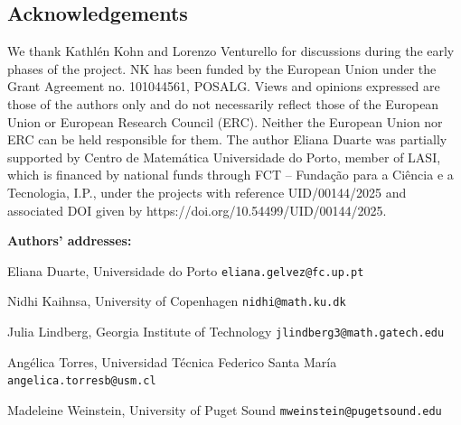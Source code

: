 \documentclass{article}
\numberwithin{theorem}{section}
\theoremstyle{definition}
\theoremstyle{example_contd}
\begin{document}
\subsection*{Acknowledgements}
{\small We thank Kathlén Kohn and Lorenzo Venturello for discussions during the early phases of the project. NK has been funded by the European Union under the Grant Agreement no. 101044561, POSALG. Views and opinions expressed are those of the authors only and do not necessarily reflect those of the European Union or European Research Council (ERC). Neither the European Union nor ERC can be held responsible for them. The author Eliana Duarte was partially supported by Centro de Matemática Universidade do Porto, member of LASI, which is financed by national funds through FCT – Fundação para a Ciência e a Tecnologia, I.P., under the projects with reference UID/00144/2025 and associated DOI given by https://doi.org/10.54499/UID/00144/2025.}




\vspace{1cm}

\noindent
\footnotesize {\bf Authors' addresses:}

\smallskip

\noindent Eliana Duarte, Universidade do Porto
 \hfill  {\tt eliana.gelvez@fc.up.pt}

\noindent Nidhi Kaihnsa, University of Copenhagen
 \hfill  {\tt nidhi@math.ku.dk}

\noindent Julia Lindberg, Georgia Institute of Technology
 \hfill  {\tt jlindberg3@math.gatech.edu}

\noindent Angélica Torres, Universidad Técnica Federico Santa María
 \hfill  {\tt angelica.torresb@usm.cl}

\noindent Madeleine Weinstein, University of Puget Sound
 \hfill  {\tt mweinstein@pugetsound.edu}
\end{document}
